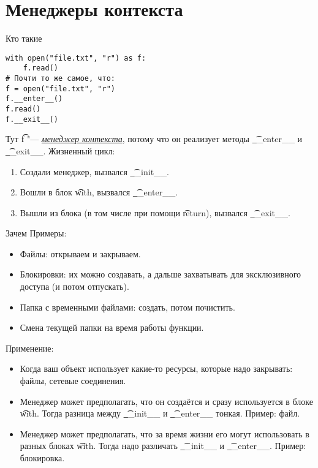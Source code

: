 \section{Менеджеры контекста}

\begin{frame}
\end{frame}

\begin{frame}[fragile]{Кто такие}
\begin{verbatim}
with open("file.txt", "r") as f:
    f.read()
# Почти то же самое, что:
f = open("file.txt", "r")
f.__enter__()
f.read()
f.__exit__()
\end{verbatim}
	Тут \t{f} "--- \href{https://docs.python.org/3/library/stdtypes.html\#typecontextmanager}{\textit{менеджер контекста}}, потому что он реализует методы \t{\_\_enter\_\_} и \t{\_\_exit\_\_}.
	Жизненный цикл:
	\begin{enumerate}
		\item Создали менеджер, вызвался \t{\_\_init\_\_}.
		\item Вошли в блок \t{with}, вызвался \t{\_\_enter\_\_}.
		\item Вышли из блока (в том числе при помощи \t{return}), вызвался \t{\_\_exit\_\_}.
	\end{enumerate}
\end{frame}

\begin{frame}{Зачем}
	Примеры:
	\begin{itemize}
		\item Файлы: открываем и закрываем.
		\item Блокировки: их можно создавать, а дальше захватывать для эксклюзивного доступа (и потом отпускать).
		\item Папка с временными файлами: создать, потом почистить.
		\item Смена текущей папки на время работы функции.
	\end{itemize}
	Применение:
	\begin{itemize}
		\item Когда ваш объект использует какие-то ресурсы, которые надо закрывать: файлы, сетевые соединения.
		\item Менеджер может предполагать, что он создаётся и сразу используется в блоке \t{with}.
			Тогда разница между \t{\_\_init\_\_} и \t{\_\_enter\_\_} тонкая.
			Пример: файл.
		\item
			Менеджер может предполагать, что за время жизни его могут использовать в разных блоках \t{with}.
			Тогда надо различать \t{\_\_init\_\_} и \t{\_\_enter\_\_}.
			Пример: блокировка.
	\end{itemize}
\end{frame}

